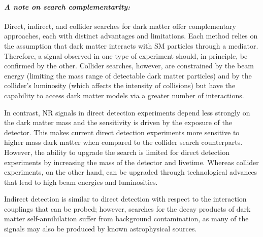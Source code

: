 \paragraph{\textit{A note on search complementarity:}} Direct, indirect, and collider searches for dark matter offer complementary approaches, each with distinct advantages and limitations. Each method relies on the assumption that dark matter interacts with SM particles through a mediator. Therefore, a signal observed in one type of experiment should, in principle, be confirmed by the other. Collider searches, however, are constrained by the beam energy (limiting the mass range of detectable dark matter particles) and by the collider's luminosity (which affects the intensity of collisions) but have the capability to access dark matter models via a greater number of interactions.

In contrast, NR signals in direct detection experiments depend less strongly on the dark matter mass and the sensitivity is driven by the exposure of the detector. This makes current direct detection experiments more sensitive to higher mass dark matter when compared to the collider search counterparts. However, the ability to upgrade the search is limited for direct detection experiments by increasing the mass of the detector and livetime. Whereas collider experiments, on the other hand, can be upgraded through technological advances that lead to high beam energies and luminosities.

Indirect detection is similar to direct detection with respect to the interaction couplings that can be probed; however, searches for the decay products of dark matter self-annihilation suffer from background contamination, as many of the signals may also be produced by known astrophysical sources.

